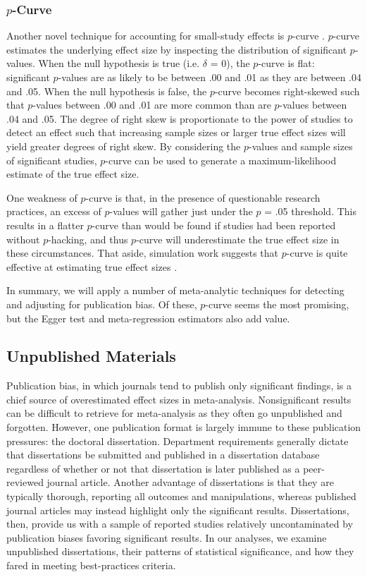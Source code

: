 \documentclass[man]{apa6}
\begin{document}
\subsubsection{$p$-Curve}
Another novel technique for accounting for small-study effects is $p$-curve \citep{Simonsohn:etal:2014,Simonsohn:etal:2014b}. $p$-curve estimates the underlying effect size by inspecting the distribution of significant $p$-values. 
When the null hypothesis is true (i.e. $\delta$ = 0), the $p$-curve is flat: significant $p$-values are as likely to be between .00 and .01 as they are between .04 and .05. When the null hypothesis is false, the $p$-curve becomes right-skewed such that $p$-values between .00 and .01 are more common than are $p$-values between .04 and .05. The degree of right skew is proportionate to the power of studies to detect an effect such that increasing sample sizes or larger true effect sizes will yield greater degrees of right skew. By considering the $p$-values and sample sizes of significant studies, $p$-curve can be used to generate a maximum-likelihood estimate of the true effect size.

One weakness of $p$-curve is that, in the presence of questionable research practices, an excess of $p$-values will gather just under the $p$ = .05 threshold. This results in a flatter $p$-curve than would be found if studies had been reported without $p$-hacking, and thus $p$-curve will underestimate the true effect size in these circumstances. That aside, simulation work suggests that $p$-curve is quite effective at estimating true effect sizes \citep{Simonsohn:etal:2014,Simonsohn:etal:2014b}.

In summary, we will apply a number of meta-analytic techniques for detecting and adjusting for publication bias. Of these, $p$-curve seems the most promising, but the Egger test and meta-regression estimators also add value.

\subsection{Unpublished Materials}
Publication bias, in which journals tend to publish only significant findings, is a chief source of overestimated effect sizes in meta-analysis. Nonsignificant results can be difficult to retrieve for meta-analysis as they often go unpublished and forgotten. However, one publication format is largely immune to these publication pressures: the doctoral dissertation. Department requirements generally dictate that dissertations be submitted and published in a dissertation database regardless of whether or not that dissertation is later published as a peer-reviewed journal article.  Another advantage of dissertations is that they are typically thorough, reporting all outcomes and manipulations, whereas published journal articles may instead highlight only the significant results.  Dissertations, then, provide us with a sample of reported studies relatively uncontaminated by publication biases favoring significant results. In our analyses, we examine unpublished dissertations, their patterns of statistical significance, and how they fared in meeting best-practices criteria.
\end{document}
